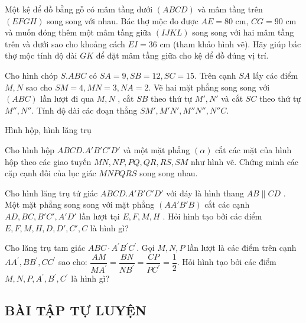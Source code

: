 \begin{vd}
	Một kệ để đồ bằng gỗ có mâm tầng dưới $(ABCD)$ và mâm tầng trên $(EFGH)$ song song với nhau. Bác thợ mộc đo được $AE=80$ cm, $CG=90$ cm và muốn đóng thêm một mâm tầng giữa $(IJKL)$ song song với hai mâm tầng trên và dưới sao cho khoảng cách $EI=36$ cm (tham khảo hình vẽ). Hãy giúp bác thợ mộc tính độ dài $GK$ để đặt mâm tầng giữa cho kệ để đồ đúng vị trí.
\end{vd}
\begin{vd}
	Cho hình chóp $S.ABC$ có $SA=9, SB=12, SC=15$. Trên cạnh $SA$ lấy các điểm $M, N$ sao cho $SM=4, MN=3, NA=2$. Vẽ hai mặt phẳng song song với $(ABC)$ lần lượt đi qua $M, N$ , cắt $SB$ theo thứ tự $M', N'$ và cắt $SC$ theo thứ tự $M'', N''$. Tính độ dài các đoạn thẳng $SM', M'N', M''N'', N''C$.
\end{vd}

\begin{dang}{Hình hộp, hình lăng trụ}
\end{dang}
\begin{vd}
Cho hình hộp $ABCD.A'B'C'D'$ và một mặt phẳng $(\alpha)$ cắt các mặt của hình hộp theo các giao tuyến $MN, NP, PQ, QR, RS, SM$ như hình vẽ. Chứng minh các cặp cạnh đối của lục giác $MNPQRS$ song song nhau.
\end{vd}
\begin{vd}
	Cho hình lăng trụ tứ giác $ABCD.A'B'C'D'$  với đáy là hình thang $AB\parallel CD$   . Một mặt phẳng song song với mặt phẳng $(AA'B'B)$   cắt các cạnh $AD, BC, B'C', A'D'$  lần lượt tại $E, F, M, H$ . Hỏi hình tạo bởi các điểm $E, F, M, H, D, D', C', C$  là hình gì?
	\loigiai{
}
\end{vd}
\begin{vd}
 Cho lăng trụ tam giác $A B C \cdot A^{\prime} B^{\prime} C^{\prime}$. Gọi $M, N, P$ lần lượt là các điểm trên cạnh $A A^{\prime}, B B^{\prime}, C C^{\prime}$ sao cho: $\dfrac{A M}{M A^{\prime}}=\dfrac{B N}{N B^{\prime}}=\dfrac{C P}{P C^{\prime}}=\dfrac{1}{2}$. Hỏi hình tạo bởi các điểm $M, N, P, A^{\prime}, B^{\prime}, C^{\prime}$ là hình gì?
 \loigiai{
}
\end{vd}


\subsection{BÀI TẬP TỰ LUYỆN}

